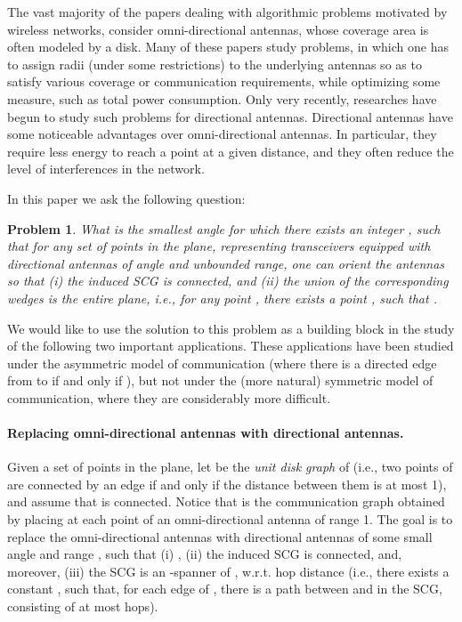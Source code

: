 \documentclass[11pt,letter]{article}
\newtheorem{problem}[theorem]{Problem}
\begin{document}
The vast majority of the papers dealing with algorithmic problems motivated by wireless networks, consider omni-directional antennas, whose coverage area is often modeled by a disk. Many of these papers study problems, in which one has to assign radii (under some restrictions) to the underlying antennas so as to satisfy various coverage or communication requirements, while optimizing some measure, such as total power consumption.
Only very recently, researches have begun to study such problems for directional antennas. Directional antennas
have some noticeable advantages over omni-directional antennas. In particular, they require less energy to reach a point at a given distance, and they often reduce the level of interferences in the network.

In this paper we ask the following question:
\begin{problem}\label{prob:smallest_angle}
What is the smallest angle  for which there exists an integer , such that for any set  of  points in the plane,
representing transceivers equipped with directional antennas of angle  and unbounded range, one can orient the antennas so that (i) the induced SCG is connected, and (ii) the union of the corresponding wedges is the entire plane, i.e., for any point , there exists a point , such that .
\end{problem}

We would like to use the solution to this problem as a building block in the study of the following two important applications.
These applications have been studied under the asymmetric model of communication (where there is a directed edge from  to  if and only if ), but not under the (more natural) symmetric model of communication, where they are considerably more difficult.

\vspace{-2mm}
\paragraph{Replacing omni-directional antennas with directional antennas.}
Given a set  of points in the plane, let  be the {\em unit disk graph} of  (i.e., two points of  are connected by an edge if and only if the distance between them is at most 1), and assume that  is connected. Notice that  is the communication graph obtained by placing at each point of  an omni-directional antenna of range 1.
The goal is to replace the omni-directional antennas with directional antennas of some small angle  and range , such that (i) , (ii) the induced SCG is connected, and, moreover, (iii) the SCG is an -spanner of , w.r.t. hop distance (i.e., there exists a constant , such that, for each edge  of , there is a path between  and  in the SCG, consisting of at most  hops).
\end{document}
